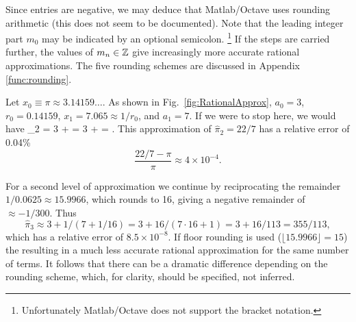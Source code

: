 \documentclass{ximera}
\begin{document}
 {\red
Since entries are negative, we may deduce that Matlab/Octave uses rounding arithmetic
(this does not seem to be documented).
 }
Note that the leading integer part $m_0$ may be indicated by an optional semicolon.%
 \footnote{ Unfortunately Matlab/Octave does not support the bracket notation.}
If the steps are carried further, the values of $m_n \in \mathbb{Z}$ give increasingly more accurate
rational approximations.  The five rounding schemes are discussed in Appendix \ref{func:rounding}.

\BEx %
Let $x_0 \equiv \pi \approx 3.14159\ldots.$
As shown in Fig.~\ref{fig:RationalApprox},
 $a_0=3$,
 $r_0 = 0.14159$,
 $x_1 = 7.065 \approx 1/r_0$,
and
 $a_1 = 7$.
If we were to stop here, we would have
\be
\widehat{\pi}_2 = 3 +  = 3 +  = .
\ee
This approximation of $\widehat{\pi}_2 = 22/7$ has a relative error of 0.04\%
 \label{eq:PiRelError}
\[
\frac{22/7 -\pi}{\pi} \approx 4\times10^{-4}.
\]
\EEx

\BEx %
For a second level of approximation we continue by reciprocating the remainder $1/0.0625 \approx 15.9966$,
which rounds to 16, giving a negative remainder of $\approx -1/300$. 
Thus
\[
\widehat{\pi}_3 \approx 3 + 1/(7 + 1/16) = 3+16/(7\cdot 16+1)= 3+ 16/113 = 355/113,
\]
which has a relative error of $8.5\times10^{-8}$.
If floor rounding is used ($\lfloor 15.9966\rfloor=15$) 
the resulting in a much less accurate rational approximation for the same number of terms.
It follows that there can be a dramatic difference depending on the rounding scheme, which, for clarity,
should be specified, not inferred.
\EEx
\end{document}
